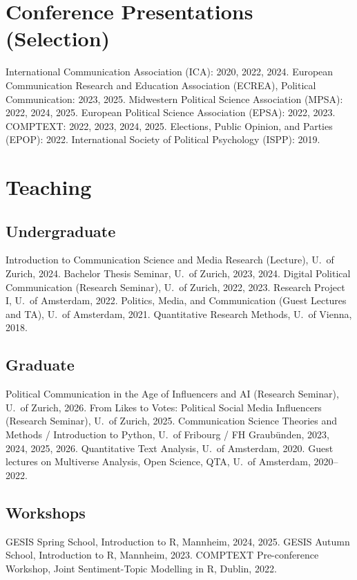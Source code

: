 \documentclass[11pt,a4paper]{article}
\begin{document}
\section{Conference Presentations (Selection)}

International Communication Association (ICA): 2020, 2022, 2024.
European Communication Research and Education Association (ECREA), Political Communication: 2023, 2025.
Midwestern Political Science Association (MPSA): 2022, 2024, 2025.
European Political Science Association (EPSA): 2022, 2023.
COMPTEXT: 2022, 2023, 2024, 2025.
Elections, Public Opinion, and Parties (EPOP): 2022.
International Society of Political Psychology (ISPP): 2019.


\section{Teaching}

\subsection{Undergraduate}
Introduction to Communication Science and Media Research (Lecture), U.\ of Zurich, 2024.
Bachelor Thesis Seminar, U.\ of Zurich, 2023, 2024.
Digital Political Communication (Research Seminar), U.\ of Zurich, 2022, 2023.
Research Project I, U.\ of Amsterdam, 2022.
Politics, Media, and Communication (Guest Lectures and TA), U.\ of Amsterdam, 2021.
Quantitative Research Methods, U.\ of Vienna, 2018.

\subsection{Graduate}
Political Communication in the Age of Influencers and AI (Research Seminar), U.\ of Zurich, 2026.
From Likes to Votes: Political Social Media Influencers (Research Seminar), U.\ of Zurich, 2025.
Communication Science Theories and Methods / Introduction to Python, U.\ of Fribourg / FH Graub\"unden, 2023, 2024, 2025, 2026.
Quantitative Text Analysis, U.\ of Amsterdam, 2020.
Guest lectures on Multiverse Analysis, Open Science, QTA, U.\ of Amsterdam, 2020--2022.

\subsection{Workshops}
GESIS Spring School, Introduction to R, Mannheim, 2024, 2025.
GESIS Autumn School, Introduction to R, Mannheim, 2023.
COMPTEXT Pre-conference Workshop, Joint Sentiment-Topic Modelling in R, Dublin, 2022.
\end{document}
